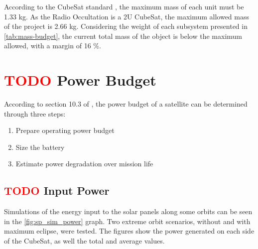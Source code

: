 According to the CubeSat standard \cite{cds}, the maximum mass of each unit must be 1.33 kg. As the Radio Occultation is a 2U CubeSat, the maximum allowed mass of the project is 2.66 kg. Considering the weight of each subsystem presented in \autoref{tab:mass-budget}, the current total mass of the object is below the maximum allowed, with a margin of 16 \%.

\section{ \textcolor{red}{TODO} Power Budget} \label{power-budget}

According to section 10.3 of \cite{larson2005}, the power budget of a satellite can be determined through three steps:

\begin{enumerate}
    \item Prepare operating power budget
    \item Size the battery
    \item Estimate power degradation over mission life
\end{enumerate}

\subsection{ \textcolor{red}{TODO} Input Power}

Simulations of the energy input to the solar panels along some orbits can be seen in the \autoref{fig:sp_sim_power} graph. Two extreme orbit scenarios, without and with maximum eclipse, were tested. The figures show the power generated on each side of the CubeSat, as well the total and average values.

